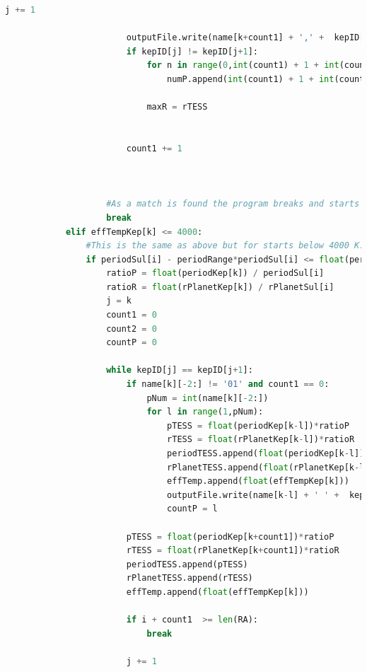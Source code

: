 \documentclass[12pt]{report}
\begin{document}
\begin{appendix}
\begin{lstlisting}[language=Python]
						j += 1		
						
						outputFile.write(name[k+count1] + ',' +  kepID[k+count1] + ',' + str(pTESS) + ',' + str(rTESS) + ',' + mStar[k+count1] + ',' + numEpoch[k+count1] + ','  + transitDur[k+count1] + ',' + rStar[k+count1] + ',' + str(RA[i]) + ',' + str(dec[i]) + ',' + effTempKep[k] + ',' + str(effTempSul[i]) + ',' + str(ICMag[i]) + '\n')
						if kepID[j] != kepID[j+1]:
							for n in range(0,int(count1) + 1 + int(countP)):
								numP.append(int(count1) + 1 + int(countP))

							maxR = rTESS
							
							
						count1 += 1
						
						
							
					#As a match is found the program breaks and starts with the next planet in the Sullivan list.
					break
			elif effTempKep[k] <= 4000:
				#This is the same as above but for starts below 4000 K.
				if periodSul[i] - periodRange*periodSul[i] <= float(periodKep[k]) <= periodSul[i] + periodRange*periodSul[i] and rPlanetSul[i] - radiusRange*rPlanetSul[i] <= float(rPlanetKep[k]) <= rPlanetSul[i] + radiusRange*rPlanetSul[i] and effTempSul[i] < 4000:
					ratioP = float(periodKep[k]) / periodSul[i]	
					ratioR = float(rPlanetKep[k]) / rPlanetSul[i]
					j = k
					count1 = 0
					count2 = 0
					countP = 0
					
					while kepID[j] == kepID[j+1]:
						if name[k][-2:] != '01' and count1 == 0:
							pNum = int(name[k][-2:])
							for l in range(1,pNum):
								pTESS = float(periodKep[k-l])*ratioP
								rTESS = float(rPlanetKep[k-l])*ratioR	
								periodTESS.append(float(periodKep[k-l])/ratioP)
								rPlanetTESS.append(float(rPlanetKep[k-l])/ratioR)
								effTemp.append(float(effTempKep[k]))
								outputFile.write(name[k-l] + ' ' +  kepID[k-l] + ' ' + str(pTESS) + ' ' + str(rTESS) + ' ' + mStar[k-l] + ' ' + numEpoch[k-l] + ' '  + transitDur[k-l] + ' ' + rStar[k-l] + ' ' + str(RA[i+count1]) + ' ' + str(dec[i+count1]) + ' ' + effTempKep[k+count1] + ' ' + str(effTempSul[i+count1]) + ' ' + str(ICMag[i+count1]) + '\n')
								countP = l
								
						pTESS = float(periodKep[k+count1])*ratioP
						rTESS = float(rPlanetKep[k+count1])*ratioR
						periodTESS.append(pTESS)
						rPlanetTESS.append(rTESS)
						effTemp.append(float(effTempKep[k]))
							
						if i + count1  >= len(RA):
							break
							
						j += 1		
						

\end{lstlisting}
\end{appendix}
\end{document}
